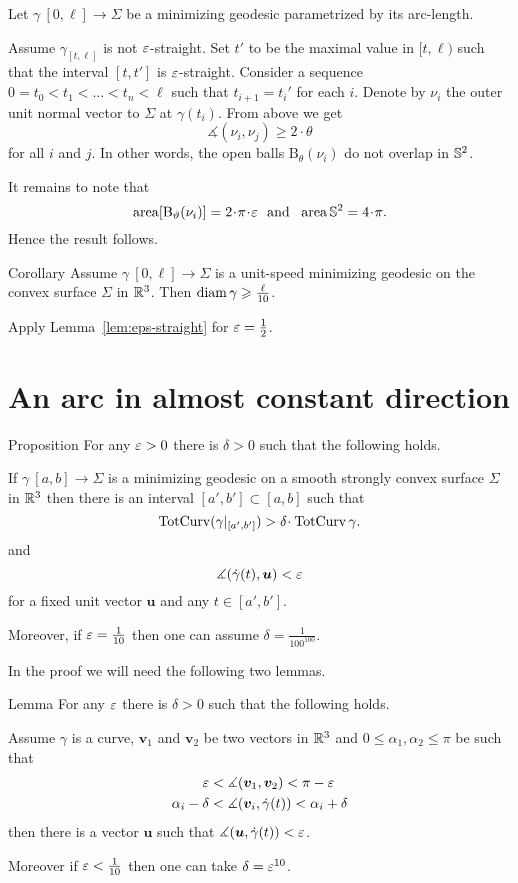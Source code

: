 \documentclass[a4paper,10pt]{amsart}
\begin{document}
Let $\gamma\:[0,\ell]\to \Sigma$ be a minimizing geodesic parametrized by its arc-length.

Assume $\gamma_{[t,\ell]}$ is not $\varepsilon$-straight.
Set $t'$ to be the maximal value in $[t,\ell)$ such that the  interval $[t,t']$ is $\varepsilon$-straight.
Consider a sequence $0=t_0<t_1<\dots<t_n<\ell$
such that $t_{i+1}=t_i'$ for each $i$.
Denote by $\nu_i$ the outer unit normal vector to $\Sigma$ at $\gamma(t_i)$. 
From above we get
\[\measuredangle(\nu_i,\nu_j)\ge2\cdot\theta\] for all $i$ and $j$.
In other words, the open balls $\mathrm{B}_\theta(\nu_i)$ do not overlap 
in $\mathbb{S}^2$.

It remains to note that 
\[\area[\mathrm{B}_\theta(\nu_i)] =2\cdot\pi\cdot\eps
 \ \ \text{and}\ \ 
 \area\SS^2=4\cdot\pi.
\]
Hence the result follows.
\qeds

\begin{thm}{Corollary}
Assume $\gamma\:[0,\ell]\to \Sigma$ is a unit-speed minimizing geodesic on the convex surface $\Sigma$ in $\mathbb{R}^3$.
Then $\operatorname{diam} \gamma\geqslant \tfrac\ell{10}$.
\end{thm}

Apply Lemma~\ref{lem:eps-straight} for $\varepsilon=\tfrac12$.
\qeds


\section{An arc in almost constant direction}

\begin{thm}{Proposition}\label{prop:almost-const}
For any $\varepsilon>0$ there is $\delta>0$ such that the following holds.

If $\gamma\:[a,b]\to\Sigma$ is a minimizing geodesic 
on a smooth strongly convex surface $\Sigma$ in $\mathbb{R}^3$
then there is an interval $[a',b']\subset[a,b]$
such that 
\[\tc(\gamma|_{[a',b']})>\delta\cdot\tc\gamma.\]
and 
\[\measuredangle(\dot\gamma(t),\bm{u})<\varepsilon\] 
for a fixed unit vector $\bm{u}$
and any $t\in[a',b']$.

Moreover, if $\varepsilon=\tfrac1{10}$ then one can assume $\delta=\tfrac1{100^{100}}$.
\end{thm}

In the proof we will need the following two lemmas.

\begin{thm}{Lemma}\label{lem:almost-const-angles}
For any $\varepsilon$ there is $\delta>0$ such that the following holds.

Assume $\gamma$ is a curve,
$\bm{v}_1$ and $\bm{v}_2$  be two vectors in $\mathbb{R}^3$
and $0\le\alpha_1,\alpha_2\le\pi$ be such that
\begin{align*}
\varepsilon
&<\measuredangle(\bm{v}_1,\bm{v}_2)<\pi-\varepsilon
\\
\alpha_i-\delta
&<\measuredangle(\bm{v}_i,\dot\gamma(t))< \alpha_i+\delta
\end{align*}
then there is a vector $\bm{u}$ such that
$\measuredangle(\bm{u},\dot\gamma(t))<\varepsilon$.

Moreover if $\varepsilon<\tfrac1{10}$ 
then one can take $\delta=\varepsilon^{10}$.
\end{thm}
\end{document}
